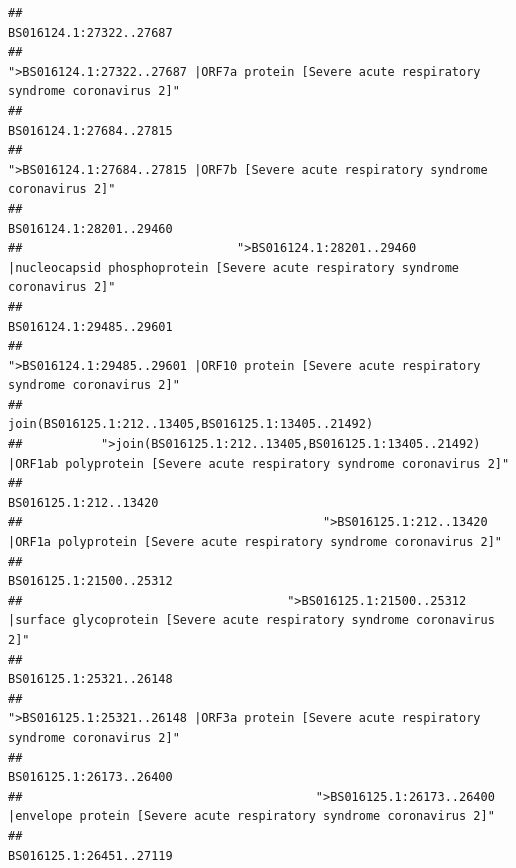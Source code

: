 \documentclass[
]{article}
\begin{document}
\begin{verbatim}
##                                                                                                                BS016124.1:27322..27687 
##                                            ">BS016124.1:27322..27687 |ORF7a protein [Severe acute respiratory syndrome coronavirus 2]" 
##                                                                                                                BS016124.1:27684..27815 
##                                                    ">BS016124.1:27684..27815 |ORF7b [Severe acute respiratory syndrome coronavirus 2]" 
##                                                                                                                BS016124.1:28201..29460 
##                              ">BS016124.1:28201..29460 |nucleocapsid phosphoprotein [Severe acute respiratory syndrome coronavirus 2]" 
##                                                                                                                BS016124.1:29485..29601 
##                                            ">BS016124.1:29485..29601 |ORF10 protein [Severe acute respiratory syndrome coronavirus 2]" 
##                                                                                    join(BS016125.1:212..13405,BS016125.1:13405..21492) 
##           ">join(BS016125.1:212..13405,BS016125.1:13405..21492) |ORF1ab polyprotein [Severe acute respiratory syndrome coronavirus 2]" 
##                                                                                                                  BS016125.1:212..13420 
##                                          ">BS016125.1:212..13420 |ORF1a polyprotein [Severe acute respiratory syndrome coronavirus 2]" 
##                                                                                                                BS016125.1:21500..25312 
##                                     ">BS016125.1:21500..25312 |surface glycoprotein [Severe acute respiratory syndrome coronavirus 2]" 
##                                                                                                                BS016125.1:25321..26148 
##                                            ">BS016125.1:25321..26148 |ORF3a protein [Severe acute respiratory syndrome coronavirus 2]" 
##                                                                                                                BS016125.1:26173..26400 
##                                         ">BS016125.1:26173..26400 |envelope protein [Severe acute respiratory syndrome coronavirus 2]" 
##                                                                                                                BS016125.1:26451..27119 

\end{verbatim}
\end{document}
